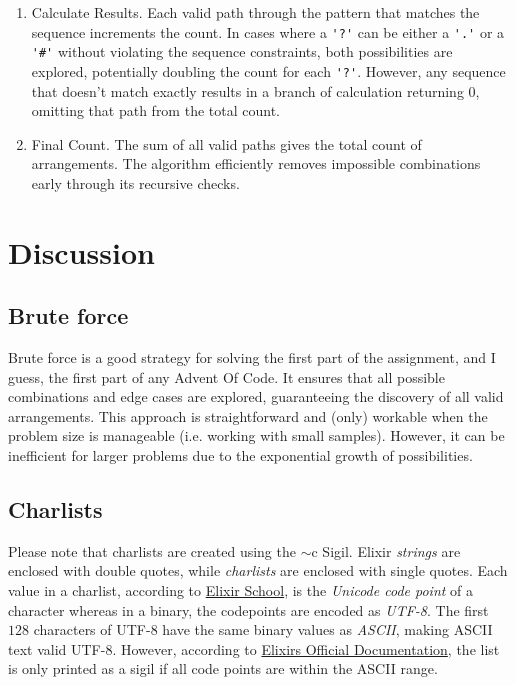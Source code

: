 \documentclass[a4paper,11pt]{article}
\begin{document}
\begin{enumerate}
\item Calculate Results. Each valid path through the pattern that matches the sequence
increments the count.
In cases where a \verb|'?'| can be either a \verb|'.'| or a \verb|'#'|
without violating the sequence constraints, both possibilities are explored,
potentially doubling the count for each \verb|'?'|.
However, any sequence that doesn't match exactly results in a branch of calculation
returning $0$, omitting that path from the total count.

\item Final Count. The sum of all valid paths gives the total count of arrangements.
The algorithm efficiently removes impossible combinations early through its
recursive checks.
\end{enumerate}



\section*{Discussion}\label{sec:discussion}
\subsection*{Brute force}
Brute force is a good strategy for solving the first part of the assignment,
and I guess, the first part of any Advent Of Code.
It ensures that all possible combinations and edge cases are explored,
guaranteeing the discovery of all valid arrangements.
This approach is straightforward and (only) workable
when the problem size is manageable (i.e. working with small samples).
However, it can be inefficient for larger problems due to the
exponential growth of possibilities.
\subsection*{Charlists}
Please note that charlists are created using the
$\sim$c Sigil.
Elixir \emph{strings} are enclosed with double quotes,
while \emph{charlists} are enclosed with single quotes.
Each value in a charlist, according to
\href{https://elixirschool.com/en/lessons/basics/strings#charlists-1}{Elixir School},
is the \emph{Unicode code point} of a character whereas in a binary,
the codepoints are encoded as \emph{UTF-8}.
The first $128$ characters of UTF-8 have the same binary values as \emph{ASCII},
making ASCII text valid UTF-8.
However, according to
\href{https://hexdocs.pm/elixir/binaries-strings-and-charlists.html}{Elixirs Official Documentation},
the list is only printed as a sigil if all code points are within the ASCII range.
\end{document}
